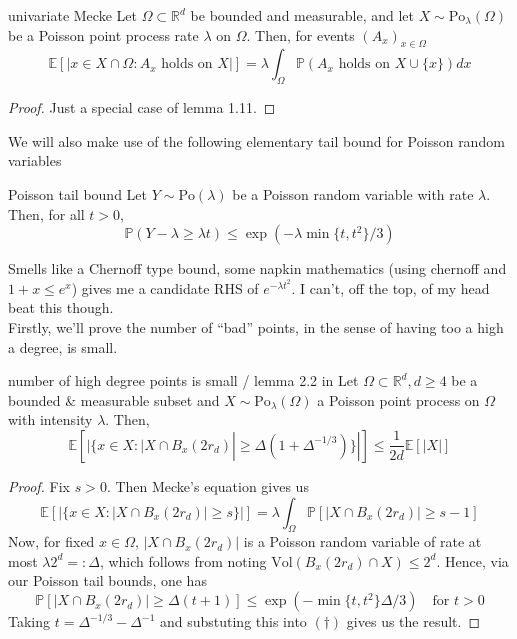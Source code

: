 \documentclass{article}
\begin{document}
\begin{lemma}[]{univariate Mecke}
    Let $\Omega \subset \mathbb{R}^d$ be bounded and measurable, and let $X \sim \text{Po}_\lambda(\Omega)$ be a
    Poisson point process rate $\lambda$ on $\Omega$. Then, for events $(A_x)_{x \in \Omega}$ 
    \[\mathbb{E}[|x \in X \cap \Omega :  A_x \text{ holds on } X|] = \lambda\int_\Omega \mathbb{P}(A_x \text{ holds on } X \cup \{x\})dx\]
\end{lemma}

\begin{proof}
    Just a special case of lemma 1.11.
\end{proof}

We will also make use of the following elementary tail bound for Poisson random variables

\begin{lemma}[]{Poisson tail bound}
    Let $Y \sim \text{Po}(\lambda)$ be a Poisson random variable with rate $\lambda$. Then, for all $t > 0$,
    \[\mathbb{P}(Y - \lambda \geq \lambda t) \leq \exp(-\lambda\min\{t, t^2\}/3)\]
\end{lemma}

Smells like a Chernoff type bound, some napkin mathematics (using chernoff and $1+x \leq e^x$) gives me a candidate 
RHS of $e^{-\lambda t^2}$. I can't, off the top, of my head beat this though. \\ 

Firstly, we'll prove the number of ``bad'' points, in the sense of having too a high a degree, is small. 

\begin{lemma}[]{number of high degree points is small / lemma 2.2 in \cite{campos2023}}
    Let $\Omega \subset \mathbb{R}^d, d \geq 4$ be a bounded $\&$ measurable subset and $X \sim \text{Po}_{\lambda}(\Omega)$ 
    a Poisson point process on $\Omega$ with intensity $\lambda$. Then, 
    \[\mathbb{E}[|\{x \in X : |X \cap B_x(2r_d)| \geq \Delta(1+\Delta^{-1/3})\}|] \leq \frac{1}{2d}\mathbb{E}[|X|]\] 
\end{lemma}

\begin{proof}
    Fix $s > 0$. Then Mecke's equation gives us 
    \[\mathbb{E}[|\{x \in X : |X \cap B_x(2r_d)| \geq s\}|] = \lambda \int_{\Omega} \mathbb{P}[|X \cap B_x(2r_d)| \geq s-1] \tag{$\dagger$}\]
    Now, for fixed $x \in \Omega$, $|X \cap B_x(2r_d)|$ is a Poisson random variable of rate at most $\lambda 2^d =: 
    \Delta$, which follows from noting $\text{Vol}(B_x(2r_d) \cap X) \leq 2^d$. Hence, via our Poisson tail bounds, one has 
    \[\mathbb{P}[|X \cap B_x(2r_d)| \geq \Delta(t+1)] \leq \exp\left(-\min\{t, t^2\}\Delta/3\right) \quad \text{for } t > 0\] 
    Taking $t = \Delta^{-1/3} - \Delta^{-1}$ and substuting this into $(\dagger)$ gives us the result.
\end{proof}

\newpage


 
\end{document}
